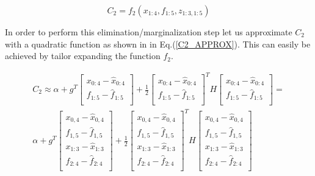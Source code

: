 \begin{equation}
C_2 = f_2(x_{1:4}, f_{1:5}, z_{1:3, 1:5})
\label{FULL_C2_COST}
\end{equation}

In order to perform this elimination/marginalization step let us approximate $C_2$ with a quadratic function as shown in in Eq.(\ref{C2_APPROX}). This can easily be achieved by tailor expanding the function $f_2$.

\begin{equation}
\begin{split}
C_2 \approx \alpha + g^T\begin{bmatrix} x_{0:4} - \hat x_{0:4} \\ 
                                  f_{1:5} - \hat f_{1:5}\\
									\end{bmatrix} 
									+ \frac{1}{2} \begin{bmatrix} x_{0:4} - \hat x_{0:4} \\ 
                                        f_{1:5} - \hat f_{1:5}\\
									              \end{bmatrix}^T H 
												\begin{bmatrix} x_{0:4} - \hat x_{0:4} \\ 
                                        f_{1:5} - \hat f_{1:5}\\
									      \end{bmatrix} = \\
		\alpha + g^T\begin{bmatrix} x_{0,4} - \hat x_{0,4}\\ 
                                f_{1,5} - \hat f_{1,5}\\
																x_{1:3} - \hat x_{1:3}\\ 
                                f_{2:4} - \hat f_{2:4}\\
									\end{bmatrix} 
									+ \frac{1}{2} \begin{bmatrix} x_{0,4} - \hat x_{0,4}\\ 
                                                f_{1,5} - \hat f_{1,5}\\
																								x_{1:3} - \hat x_{1:3}\\ 
                                                f_{2:4} - \hat f_{2:4}\\
									              \end{bmatrix}^T H 
												\begin{bmatrix} x_{0,4} - \hat x_{0,4}\\ 
                                        f_{1,5} - \hat f_{1,5}\\
																				x_{1:3} - \hat x_{1:3}\\ 
                                        f_{2:4} - \hat f_{2:4}\\
									      \end{bmatrix} 
\label{C2_APPROX}
\end{split}
\end{equation}

